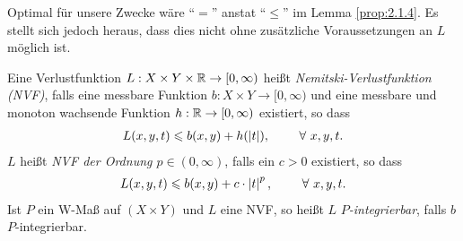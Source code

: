 Optimal für unsere Zwecke wäre ``$=$'' anstat ``$\le$'' im Lemma
\ref{prop:2.1.4}. Es stellt sich jedoch heraus, dass dies nicht ohne
zusätzliche Voraussetzungen an $L$ möglich ist.

\begin{defn}
\label{defn:2.1.5}
Eine Verlustfunktion $L:X\times Y\times \mathbb{R}\to[0,\infty)$ heißt
\emph{Nemitski-Verlustfunktion (NVF)},
falls eine messbare Funktion $b: X\times Y\to [0,\infty)$ und eine messbare und monoton wachsende Funktion $h: \mathbb{R}\to
[0,\infty)$ existiert, so dass
\begin{align*}
L(x,y,t) \le b(x,y) + h(\abs{t}),\qquad \forall x,y,t.
\end{align*}
$L$ heißt \emph{NVF der Ordnung $p\in(0,\infty)$}, falls ein $c>0$ existiert, so
dass
\begin{align*}
L(x,y,t) \le b(x,y) + c\cdot\abs{t}^p,\qquad \forall x,y,t.
\end{align*}
Ist $P$ ein W-Maß auf $(X\times Y)$ und $L$ eine NVF, so heißt $L$
\emph{$P$-integrierbar}, falls $b$
$P$-integrierbar.\fishhere
\end{defn}

